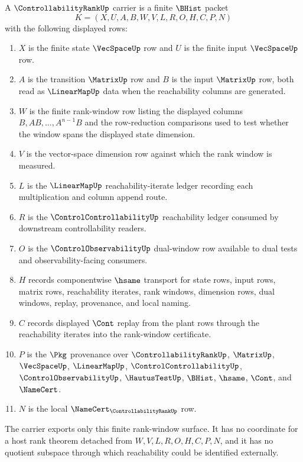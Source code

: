 \begin{definition}
\label{def:controllability-rank-carrier}
A $\ControllabilityRankUp$ carrier is a finite $\BHist$ packet
$$
K=(X,U,A,B,W,V,L,R,O,H,C,P,N)
$$
with the following displayed rows:
\begin{enumerate}
\item $X$ is the finite state $\VecSpaceUp$ row and $U$ is the finite input $\VecSpaceUp$ row.
\item $A$ is the transition $\MatrixUp$ row and $B$ is the input $\MatrixUp$ row, both read as $\LinearMapUp$ data when the reachability columns are generated.
\item $W$ is the finite rank-window row listing the displayed columns $B,AB,\ldots,A^{n-1}B$ and the row-reduction comparisons used to test whether the window spans the displayed state dimension.
\item $V$ is the vector-space dimension row against which the rank window is measured.
\item $L$ is the $\LinearMapUp$ reachability-iterate ledger recording each multiplication and column append route.
\item $R$ is the $\ControlControllabilityUp$ reachability ledger consumed by downstream controllability readers.
\item $O$ is the $\ControlObservabilityUp$ dual-window row available to dual tests and observability-facing consumers.
\item $H$ records componentwise $\hsame$ transport for state rows, input rows, matrix rows, reachability iterates, rank windows, dimension rows, dual windows, replay, provenance, and local naming.
\item $C$ records displayed $\Cont$ replay from the plant rows through the reachability iterates into the rank-window certificate.
\item $P$ is the $\Pkg$ provenance over $\ControllabilityRankUp$, $\MatrixUp$, $\VecSpaceUp$, $\LinearMapUp$, $\ControlControllabilityUp$, $\ControlObservabilityUp$, $\HautusTestUp$, $\BHist$, $\hsame$, $\Cont$, and $\NameCert$.
\item $N$ is the local $\NameCert_{\ControllabilityRankUp}$ row.
\end{enumerate}
The carrier exports only this finite rank-window surface. It has no coordinate for a host rank theorem detached from $W,V,L,R,O,H,C,P,N$, and it has no quotient subspace through which reachability could be identified externally.
\end{definition}

